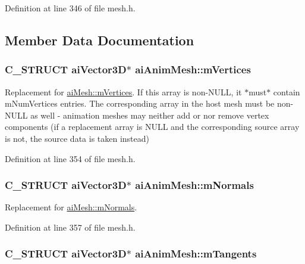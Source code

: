 Definition at line 346 of file mesh.h.

\subsection{Member Data Documentation}
\hypertarget{structai_anim_mesh_0ac2dd4c1afd23e6a9293b1d0ded3060}{
\subsubsection[mVertices]{\setlength{\rightskip}{0pt plus 5cm}C\_\-STRUCT aiVector3D$\ast$ {\bf aiAnimMesh::mVertices}}}
\label{structai_anim_mesh_0ac2dd4c1afd23e6a9293b1d0ded3060}


Replacement for \hyperlink{structai_mesh_fd4588abb3e1c72821ae0234a3850662}{aiMesh::mVertices}. If this array is non-NULL, it $\ast$must$\ast$ contain mNumVertices entries. The corresponding array in the host mesh must be non-NULL as well - animation meshes may neither add or nor remove vertex components (if a replacement array is NULL and the corresponding source array is not, the source data is taken instead) 

Definition at line 354 of file mesh.h.\hypertarget{structai_anim_mesh_64a07a8c5c419b1e006c5302bca4d334}{
\subsubsection[mNormals]{\setlength{\rightskip}{0pt plus 5cm}C\_\-STRUCT aiVector3D$\ast$ {\bf aiAnimMesh::mNormals}}}
\label{structai_anim_mesh_64a07a8c5c419b1e006c5302bca4d334}


Replacement for \hyperlink{structai_mesh_ec81b496b4d93838cef038933dabe9b9}{aiMesh::mNormals}. 

Definition at line 357 of file mesh.h.\hypertarget{structai_anim_mesh_95dcc49c6d5ecc570ceb54552a0a9625}{
\subsubsection[mTangents]{\setlength{\rightskip}{0pt plus 5cm}C\_\-STRUCT aiVector3D$\ast$ {\bf aiAnimMesh::mTangents}}}
\label{structai_anim_mesh_95dcc49c6d5ecc570ceb54552a0a9625}



